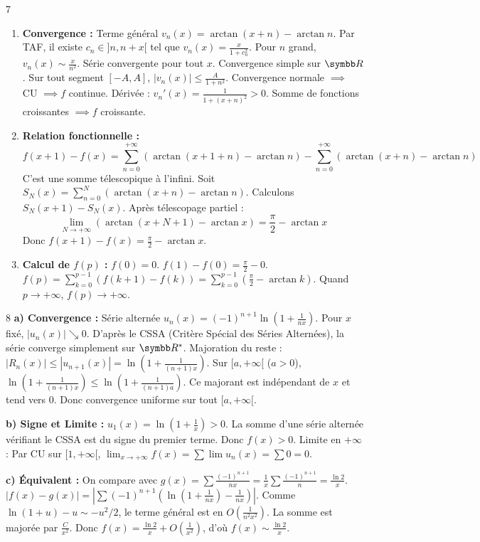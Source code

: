 \begin{correction}{7}
\begin{enumerate}
    \item \textbf{Convergence :}
    Terme général $v_n(x) = \arctan(x+n) - \arctan n$.
    Par TAF, il existe $c_n \in ]n, n+x[$ tel que $v_n(x) = \frac{x}{1+c_n^2}$.
    Pour $n$ grand, $v_n(x) \sim \frac{x}{n^2}$. Série convergente pour tout $x$.
    Convergence simple sur $\R$.
    Sur tout segment $[-A, A]$, $|v_n(x)| \le \frac{A}{1+n^2}$. Convergence normale $\implies$ CU $\implies f$ continue.
    Dérivée : $v_n'(x) = \frac{1}{1+(x+n)^2} > 0$. Somme de fonctions croissantes $\implies f$ croissante.

    \item \textbf{Relation fonctionnelle :}
    $$ f(x+1) - f(x) = \sum_{n=0}^{+ \infty} (\arctan(x+1+n) - \arctan n) - \sum_{n=0}^{+ \infty} (\arctan(x+n) - \arctan n) $$
    C'est une somme télescopique à l'infini.
    Soit $S_N(x) = \sum_{n=0}^N (\arctan(x+n) - \arctan n)$.
    Calculons $S_N(x+1) - S_N(x)$.
    Après télescopage partiel :
    $$ \lim_{N\to+ \infty} (\arctan(x+N+1) - \arctan x) = \frac{\pi}{2} - \arctan x $$
    Donc $f(x+1) - f(x) = \frac{\pi}{2} - \arctan x$.

    \item \textbf{Calcul de $f(p)$ :}
    $f(0) = 0$.
    $f(1) - f(0) = \frac{\pi}{2} - 0$.
    $f(p) = \sum_{k=0}^{p-1} (f(k+1)-f(k)) = \sum_{k=0}^{p-1} (\frac{\pi}{2} - \arctan k)$.
    Quand $p \to + \infty$, $f(p) \to +\infty$.
\end{enumerate}
\end{correction}

\begin{correction}{8}
\textbf{a) Convergence :}
Série alternée $u_n(x) = (-1)^{n+1} \ln(1+\frac{1}{nx})$.
Pour $x$ fixé, $|u_n(x)| \searrow 0$. D'après le CSSA (Critère Spécial des Séries Alternées), la série converge simplement sur $\R^*$.
Majoration du reste : $|R_n(x)| \le |u_{n+1}(x)| = \ln(1+\frac{1}{(n+1)x})$.
Sur $[a, +\infty[$ ($a>0$), $\ln(1+\frac{1}{(n+1)x}) \le \ln(1+\frac{1}{(n+1)a})$.
Ce majorant est indépendant de $x$ et tend vers 0.
Donc convergence uniforme sur tout $[a, +\infty[$.

\textbf{b) Signe et Limite :}
$u_1(x) = \ln(1+\frac{1}{x}) > 0$. La somme d'une série alternée vérifiant le CSSA est du signe du premier terme. Donc $f(x) > 0$.
Limite en $+\infty$ : Par CU sur $[1, +\infty[$, $\lim_{x\to+\infty} f(x) = \sum \lim u_n(x) = \sum 0 = 0$.

\textbf{c) Équivalent :}
On compare avec $g(x) = \sum \frac{(-1)^{n+1}}{nx} = \frac{1}{x} \sum \frac{(-1)^{n+1}}{n} = \frac{\ln 2}{x}$.
$|f(x) - g(x)| = \left| \sum (-1)^{n+1} (\ln(1+\frac{1}{nx}) - \frac{1}{nx}) \right|$.
Comme $\ln(1+u) - u \sim -u^2/2$, le terme général est en $O(\frac{1}{n^2 x^2})$.
La somme est majorée par $\frac{C}{x^2}$.
Donc $f(x) = \frac{\ln 2}{x} + O(\frac{1}{x^2})$, d'où $f(x) \sim \frac{\ln 2}{x}$.
\end{correction}

